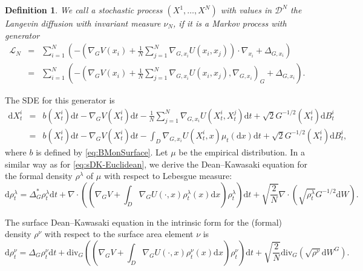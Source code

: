 \documentclass[11pt, a4paper]{article}
\newcommand{\cdummy}{\cdot}
\newcommand{\mathd}{\mathrm{d}}
\newcommand{\tmem}[1]{{\em #1\/}}
\newtheorem{definition}[theorem]{Definition}
\begin{document}
\begin{definition}
  We call a stochastic process $(X^1, \ldots, X^N)$ with values in $\mathcal{D}^N$ the
  {\tmem{Langevin diffusion with invariant measure $\nu_N$}}, if it is a
  Markov process with generator
  \begin{eqnarray*}
    \mathcal{L}_N & = & \sum_{i = 1}^N \left( - \left( \nabla_G V (x_i) +
    \frac{1}{N} \sum_{j = 1}^N \nabla_{G, x_i} U (x_i, x_j) \right) \cdummy
    \nabla_{x_i} + \Delta_{G, x_i} \right)\\
    & = & \sum_{i = 1}^N \left( - \left( \nabla_G V (x_i) + \frac{1}{N}
    \sum_{j = 1}^N \nabla_{G, x_i} U (x_i, x_j), \nabla_{G, x_i} \right)_G +
    \Delta_{G, x_i} \right).
  \end{eqnarray*}
\end{definition}

The SDE for this generator is
\begin{eqnarray}\label{eq:Lang}
  \mathd X^i_t & = & b (X^i_t) \mathd t - \nabla_G V (X^i_t) \mathd t -
  \frac{1}{N} \sum_{j = 1}^N \nabla_{G, x_i} U (X^i_t, X^j_t) \mathd t +
  \sqrt{2} G^{- 1 / 2} (X_t^i) \mathd B^i_t \\
  & = & b (X^i_t) \mathd t - \nabla_G V (X^i_t) \mathd t - \int_D \nabla_{G,
  x_i} U (X^i_t, x) \mu_t (\mathd x) \mathd t + \sqrt{2} G^{- 1 / 2} (X_t^i)
  \mathd B^i_t,\nonumber 
\end{eqnarray}
where $b$ is defined by \eqref{eq:BMonSurface}. Let $\mu$ be the empirical distribution. In a similar way as for \eqref{eq:sDK-Euclidean}, we derive the  Dean--Kawasaki equation for the formal density $\rho^\lambda$ of $\mu$ with respect to Lebesgue measure:
\begin{equation*}
    \mathd \rho_t^\lambda = \Delta_G^{\ast} \rho_t^\lambda \mathd t +
   \nabla \cdummy \left( \left( \nabla_G V + \int_D \nabla_G U (\cdummy, x)
   \rho_t^\lambda(x) \mathd x \right) \rho_t^\lambda \right) \mathd t +
   \sqrt{\frac{2}{N}} \nabla \cdummy \left( \sqrt{\rho_t^\lambda} G^{- 1 /
   2} \mathd W \right) . 
\end{equation*} 

The surface Dean--Kawasaki equation in the intrinsic form for the (formal) density $\rho^\nu$ with respect to the surface area element $\nu$ is
\begin{equation}\label{eq:sDK-nu-potential}
    \mathd\rho^\nu_t = \Delta_G \rho^\nu_t \mathd t+  \text{div}_G \left(\left(\nabla_G V +\int_D \nabla_G U (\cdummy, x)
   \rho_t^\nu(x) \mathd x \right)\rho^\nu_t\right) \mathd t+ \sqrt{\frac{2}{N}}\text{div}_G(\sqrt{\rho^\nu}\mathd W^G).
\end{equation}
\end{document}
